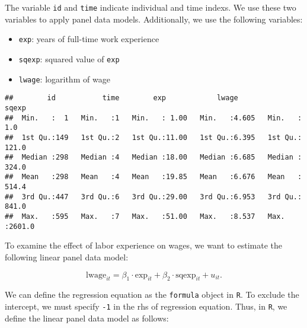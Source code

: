 \documentclass[
  12pt,
]{article}
\newenvironment{Shaded}{\begin{snugshade}}{\end{snugshade}}
\newcommand{\DecValTok}[1]{\textcolor[rgb]{0.00,0.00,0.81}{#1}}
\newcommand{\FunctionTok}[1]{\textcolor[rgb]{0.00,0.00,0.00}{#1}}
\newcommand{\NormalTok}[1]{#1}
\newcommand{\OtherTok}[1]{\textcolor[rgb]{0.56,0.35,0.01}{#1}}
\newcommand{\SpecialCharTok}[1]{\textcolor[rgb]{0.00,0.00,0.00}{#1}}
\newcommand{\StringTok}[1]{\textcolor[rgb]{0.31,0.60,0.02}{#1}}
\providecommand{\tightlist}{%
  \setlength{\itemsep}{0pt}\setlength{\parskip}{0pt}}
\begin{document}
The variable \texttt{id} and \texttt{time} indicate individual and time
indexs. We use these two variables to apply panel data models.
Additionally, we use the following variables:

\begin{itemize}
\tightlist
\item
  \texttt{exp}: years of full-time work experience
\item
  \texttt{sqexp}: squared value of \texttt{exp}
\item
  \texttt{lwage}: logarithm of wage
\end{itemize}

\begin{Shaded}
\end{Shaded}

\begin{verbatim}
##        id           time        exp            lwage           sqexp       
##  Min.   :  1   Min.   :1   Min.   : 1.00   Min.   :4.605   Min.   :   1.0  
##  1st Qu.:149   1st Qu.:2   1st Qu.:11.00   1st Qu.:6.395   1st Qu.: 121.0  
##  Median :298   Median :4   Median :18.00   Median :6.685   Median : 324.0  
##  Mean   :298   Mean   :4   Mean   :19.85   Mean   :6.676   Mean   : 514.4  
##  3rd Qu.:447   3rd Qu.:6   3rd Qu.:29.00   3rd Qu.:6.953   3rd Qu.: 841.0  
##  Max.   :595   Max.   :7   Max.   :51.00   Max.   :8.537   Max.   :2601.0
\end{verbatim}

To examine the effect of labor experience on wages, we want to estimate
the following linear panel data model:

\[
  \text{lwage}_{it} = 
  \beta_1 \cdot \text{exp}_{it} +
  \beta_2 \cdot \text{sqexp}_{it} + 
  u_{it}.
\]

We can define the regression equation as the \texttt{formula} object in
\texttt{R}. To exclude the intercept, we must specify \texttt{-1} in the
rhs of regression equation. Thus, in \texttt{R}, we define the linear
panel data model as follows:
\end{document}
